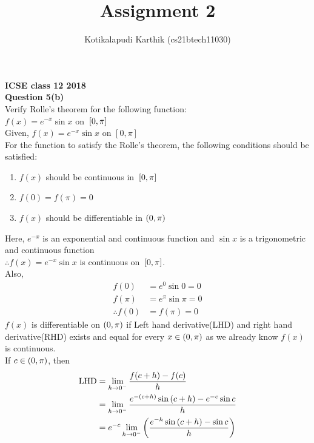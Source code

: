 \documentclass[journal,12pt,twocolumn]{IEEEtran}
\begin{document}
\let\vec\mathbf
\def\putbox#1#2#3{\makebox[0in][l]{\makebox[#1][l]{}\raisebox{\baselineskip}[0in][0in]{\raisebox{#2}[0in][0in]{#3}}}}
     \def\rightbox#1{\makebox[0in][r]{#1}}
     \def\centbox#1{\makebox[0in]{#1}}
     \def\topbox#1{\raisebox{-\baselineskip}[0in][0in]{#1}}
     \def\midbox#1{\raisebox{-0.5\baselineskip}[0in][0in]{#1}}
\title{ Assignment 2 }
\author{ Kotikalapudi Karthik (cs21btech11030)%
}
\maketitle
\textbf{ICSE class 12 2018}\\
\textbf{Question 5(b)}\\
Verify Rolle's theorem for the following function:\\
$f(x) = e^{-x} \sin x$ on ${}\left[0,\pi\right]$\\
\solution
Given, $f(x) = e^{-x} \sin x$ on $[0,\pi]$\\
For the function to satisfy the Rolle's theorem, the following conditions should be satisfied:
\begin{enumerate}
    \item $f(x)$ should be continuous in ${}\left[0,\pi\right]$
    \item $f(0) = f(\pi) = 0$
    \item $f(x)$ should be differentiable in $\left(0,\pi\right)$
\end{enumerate}
Here, $e^{-x}$ is an exponential and continuous function and $\sin x$ is a trigonometric and continuous function\\
$\therefore f(x) = e^{-x} \sin x$ is continuous on ${}\left[0,\pi\right]$.\\
Also,
\begin{align}
    f(0) &= e^{0} \sin 0 = 0\\
    f(\pi) &= e^{\pi} \sin \pi = 0\\
    \therefore f(0) &= f(\pi) = 0
\end{align}
$f(x)$ is differentiable on $\left(0,\pi\right)$ if Left hand derivative(LHD) and right hand derivative(RHD) exists and equal for every $x \in \left(0,\pi\right)$ as we already know $f(x)$ is continuous.\\
If $c \in \left(0,\pi\right)$, then
\begin{align}
    \text{LHD} &= \lim_{h \to 0^{-}} \frac{f(c+h)-f(c)}{h}\\
    &= \lim_{h \to 0^{-}} \frac{e^{-\left(c+h\right)} \sin \left(c+h\right) - e^{-c} \sin c}{h}\\
    \label{eq-1}
    &= e^{-c} \lim_{h \to 0^{-}} \left(\frac{e^{-h} \sin \left(c+h\right) - \sin c}{h}\right)
\end{align}
\end{document}
